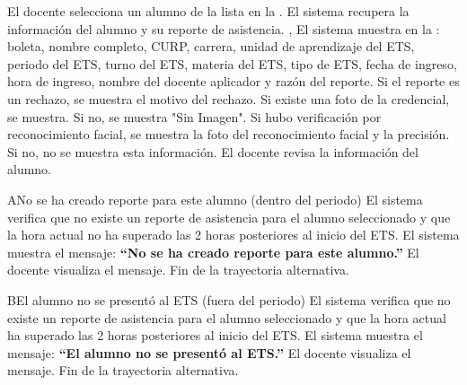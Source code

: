 \begin{UCtrayectoria}
	\UCpaso[\UCactor] El docente selecciona un alumno de la lista en la .
	\UCpaso El sistema recupera la información del alumno y su reporte de asistencia. , 
	\UCpaso El sistema muestra en la : boleta, nombre completo, CURP, carrera, unidad de aprendizaje del ETS, periodo del ETS, turno del ETS, materia del ETS, tipo de ETS, fecha de ingreso, hora de ingreso, nombre del docente aplicador y razón del reporte.
	\UCpaso Si el reporte es un rechazo, se muestra el motivo del rechazo.
	\UCpaso Si existe una foto de la credencial, se muestra. Si no, se muestra "Sin Imagen".
	\UCpaso Si hubo verificación por reconocimiento facial, se muestra la foto del reconocimiento facial y la precisión. Si no, no se muestra esta información.
	\UCpaso[\UCactor] El docente revisa la información del alumno.
\end{UCtrayectoria}

\begin{UCtrayectoriaA}{A}{No se ha creado reporte para este alumno (dentro del periodo)}
	\UCpaso El sistema verifica que no existe un reporte de asistencia para el alumno seleccionado y que la hora actual no ha superado las 2 horas posteriores al inicio del ETS.
	\UCpaso El sistema muestra el mensaje: \textbf{ ``No se ha creado reporte para este alumno.''}
	\UCpaso[\UCactor] El docente visualiza el mensaje.
	\UCpaso Fin de la trayectoria alternativa.
\end{UCtrayectoriaA}

\begin{UCtrayectoriaA}{B}{El alumno no se presentó al ETS (fuera del periodo)}
	\UCpaso El sistema verifica que no existe un reporte de asistencia para el alumno seleccionado y que la hora actual ha superado las 2 horas posteriores al inicio del ETS.
	\UCpaso El sistema muestra el mensaje: \textbf{ ``El alumno no se presentó al ETS.''}
	\UCpaso[\UCactor] El docente visualiza el mensaje.
	\UCpaso Fin de la trayectoria alternativa.
\end{UCtrayectoriaA}




